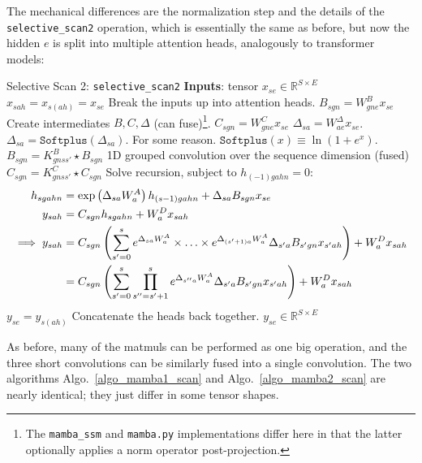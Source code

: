 The mechanical differences are the normalization step and the details of the
\texttt{selective\_scan2} operation, which is essentially the same as before, but now the hidden $ e
$ is split into multiple attention heads, analogously to transformer models:

\begin{algo}{Selective Scan 2: \texttt{selective\_scan2} }
\State \textbf{Inputs}: tensor $ x _{ se }\in \mathbb{R}^{ S\times E } $
\State $ x _{ sah } = x _{ s(ah) } = x_{ se } $  \Comment Break the inputs up into attention heads.
\State $ B _{ sgn } = W ^{ B }_{ gne }x _{ se } $  \Comment Create intermediates $B, C, \Delta  $ (can
fuse)\footnote{The \texttt{mamba\_ssm} and \texttt{mamba.py} implementations differ here in that the
latter optionally applies a norm operator post-projection.}.
\State $ C _{ sgn } = W ^{ C }_{ gne }x _{ se } $
\State $ \Delta  _{ sa } = W ^{ \Delta   }_{ ae } x _{ se } $.
\State $ \Delta  _{ sa } = \texttt{Softplus} \left (\Delta _{ sa }\right ) $. \Comment For some reason. $ \texttt{Softplus}(x) \equiv \ln \left ( 1+ e^{ x } \right ) $.
\State $ B _{ sgn } = K ^{ B } _{ gnss' }\star B_{ sgn}$ \Comment 1D grouped convolution over the sequence dimension (fused)
\State $ C _{ sgn } = K ^{ C } _{ gnss' }\star C_{ sgn }$
\State Solve recursion, subject to $ h _{ (-1)gahn }=0 $:
\begin{align}
    h _{ sgahn } &= \exp \left ( \Delta  _{ sa } W^{A} _{ a } \right ) h _{ (s-1)gah n} + \Delta _{ sa }B _{ sgn }x _{ se }\nonumber\\
    y _{ sah } &= C _{ sgn }h _{ sgahn } +  W ^{ D } _{ a }x _{ sah } \nonumber\\
    \implies y _{ sah } &= C _{ sgn }\left (\sum _{ s'=0 }^{ s }e^{ \Delta _{ sa }W^{A} _{ a } }\times \ldots \times e^{ \Delta _{ (s'+1)a }W^{A} _{ a } } \Delta _{ s'a }B _{ s'gn } x _{ s'ah }\right ) + W ^{ D } _{ a } x _{ sah }\nonumber\\
   &= C _{ sgn }\left (\sum _{ s'=0 }^{ s }\prod_{ s''=s'+1 }^{ s  }e^{ \Delta _{ s''a }W^{A} _{ a } } \Delta _{ s'a }B _{ s'gn } x _{ s'ah }\right ) + W ^{ D } _{ a } x _{ sah }
\end{align}
\State $ y _{ se } = y _{ s(ah) } $  \Comment Concatenate the heads back together.
\State \Return $ y _{ se } \in \mathbb{R}^{ S\times E }$
\label{algo_mamba2_scan}
\end{algo}
As before, many of the matmuls can be performed as one big operation, and the three short
convolutions can be similarly fused into a single convolution. The two algorithms
Algo.~\ref{algo_mamba1_scan} and Algo.~\ref{algo_mamba2_scan} are nearly identical; they just differ
in some tensor shapes.


